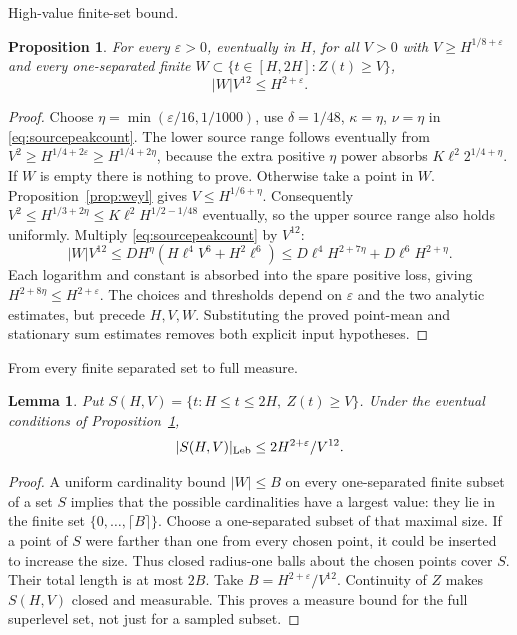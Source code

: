 \documentclass[11pt,a4paper]{article}
\numberwithin{equation}{section}
\newtheorem{lemma}[theorem]{Lemma}
\newtheorem{proposition}[theorem]{Proposition}
\theoremstyle{definition}
\newcommand{\zabs}{Z}
\begin{document}
\par\medskip\noindent High-value finite-set bound.
\begin{proposition}\label{prop:peakcard}
For every $\varepsilon>0$, eventually in $H$, for all $V>0$ with
$V\ge H^{1/8+\varepsilon}$ and every one-separated finite
$W\subset\{t\in[H,2H]:\zabs(t)\ge V\}$,
\[
 |W|V^{12}\le H^{2+\varepsilon}.
\]
\end{proposition}
\begin{proof}
Choose $\eta=\min(\varepsilon/16,1/1000)$, use
$\delta=1/48$, $\kappa=\eta$, $\nu=\eta$ in
\eqref{eq:sourcepeakcount}. The lower source range follows eventually from
$V^2\ge H^{1/4+2\varepsilon}\ge H^{1/4+2\eta}$, because the extra
positive $\eta$ power absorbs $K\ell^2 2^{1/4+\eta}$.
If $W$ is empty there is nothing to prove. Otherwise take a point in $W$.
Proposition~\ref{prop:weyl} gives $V\le H^{1/6+\eta}$. Consequently
$V^2\le H^{1/3+2\eta}\le K\ell^2 H^{1/2-1/48}$ eventually, so the
upper source range also holds uniformly.
Multiply \eqref{eq:sourcepeakcount} by $V^{12}$:
\[
 |W|V^{12}\le D H^\eta(H\ell^4V^6+H^2\ell^6)
       \le D\ell^4H^{2+7\eta}+D\ell^6H^{2+\eta}.
\]
Each logarithm and constant is absorbed into the spare positive loss, giving
$H^{2+8\eta}\le H^{2+\varepsilon}$.
The choices and thresholds depend on $\varepsilon$ and the two
analytic estimates, but precede $H,V,W$. Substituting the proved point-mean
and stationary sum estimates removes both explicit input hypotheses.
\end{proof}

\par\medskip\noindent From every finite separated set to full measure.
\begin{lemma}\label{lem:peakmeasure}
Put $S(H,V)=\{t:H\le t\le2H,\ \zabs(t)\ge V\}$.
Under the eventual conditions of Proposition~\ref{prop:peakcard},
\[
 |S(H,V)|_{\rm Leb}\le2H^{2+\varepsilon}/V^{12}.
\]
\end{lemma}
\begin{proof}
A uniform cardinality bound $|W|\le B$ on every one-separated finite subset
of a set $S$ implies that the possible cardinalities have a largest value:
they lie in the finite set $\{0,\ldots,\lceil B\rceil\}$.
Choose a one-separated subset of that maximal size. If a point of $S$ were
farther than one from every chosen point, it could be inserted to increase the
size. Thus closed radius-one balls about the chosen points cover $S$.
Their total length is at most $2B$. Take $B=H^{2+\varepsilon}/V^{12}$.
Continuity of $\zabs$ makes $S(H,V)$ closed and measurable. This proves a
measure bound for the full superlevel set, not just for a sampled subset.
\end{proof}
\end{document}
